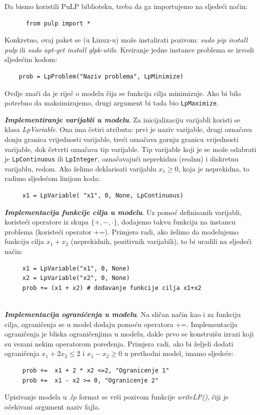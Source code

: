 \documentclass[a4paper, utf8, 11pt, colorlinks]{book}
\begin{document}
 Da bismo koristili PuLP biblioteku, treba da ga importujemo na sljedeći način:
 \begin{verbatim}
 	  from pulp import *
 \end{verbatim}
 Konkretno, ovaj paket se (u Linux-u) može instalirati pozivom: \emph{sudo pip install pulp} ili \emph{sudo apt-get install glpk-utils}. 
 Kreiranje jedne instance problema se izvodi sljedećim kodom:
 \begin{verbatim}
 	prob = LpProblem("Naziv problema", LpMinimize)
 \end{verbatim}
Ovdje znači da je riječ o modelu čija se funkcija cilja minimizuje. Ako bi bilo potrebno da maksimizujemo, drugi argument bi tada bio \texttt{LpMaximize}. 

\textbf{\emph{Implementiranje varijabli u modelu}}.  Za inicijalizaciju varijabli koristi se klasa \emph{LpVariable}. Ona ima četiri atributa: prvi je naziv varijable, drugi označava donju granica vrijednosti varijable, treći označava gornju granicu vrijednosti varijable, dok četvrti označava tip varijable. Tip varijable koji je se može odabrati je \texttt{LpContinuous} ili \texttt{LpInteger}, označavajući neprekidnu (realnu) i diskretnu varijablu, redom.  
Ako želimo deklarisati varijablu $x_1\geq 0$, koja je neprekidna, to radimo sljedećom linijom koda:
\begin{verbatim}
	 x1 = LpVariable( "x1", 0, None, LpContinuous)
\end{verbatim}
\textbf{\emph{Implementacija funkcije cilja u modelu}}. Uz pomoć definisanih varijabli, koristeći operatore iz skupa $\{+,-, \cdot \}$, dodajemo takvu funkciju na instancu problema (koristeći operator +=). Primjera radi, ako želimo da modelujemo funkciju cilja $x_1 + x_2$ (neprekidnih, pozitivnih varijabili), to bi uradili na sljedeći način:
\begin{verbatim}
	 x1 = LpVariable("x1", 0, None)
	 x2 = LpVariable("x2", 0, None) 
	 prob += (x1 + x2) # dodavanje funkcije cilja x1+x2 
\end{verbatim} \\ \vspace{-1.5cm}
\textbf{\emph{Implementacija ograničenja u modelu}}.  Na sličan način kao i za funkciju cilja, ograničenja se  u model dodaju pomoću operatora +=. Implementacija ograničenja je bliska ograničenjima u modelu, dakle prvo se konstruišu izrazi koji su vezani nekim operatorom poređenja. Primjera radi, ako bi željeli dodati ograničenja $x_1 + 2 x_2 \leq 2$ i $x_1-x_2 \geq 0$   u prethodni model, imamo sljedeće:
\begin{verbatim}
	 prob +=  x1 + 2 * x2 <=2, "Ogranicenje 1"
	 prob +=  x1 - x2 >= 0, "Ogranicenje 2" 
\end{verbatim}
Upisivanje modela u .$lp$ format se vrši pozivom funkcije \emph{writeLP()}, čiji je očekivani argument naziv fajla. 
\end{document}
